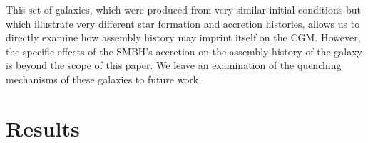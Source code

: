 \documentclass[]{emulateapj}
\begin{document}
This set of galaxies, which were produced from very similar initial conditions but which illustrate very different star formation and accretion histories, allows us to directly examine how assembly history may imprint itself on the CGM. However, the specific effects of the SMBH's accretion on the assembly history of the galaxy is beyond the scope of this paper. We leave an examination of the quenching mechanisms of these galaxies to future work. 




\section{Results}\label{redux}
\end{document}
